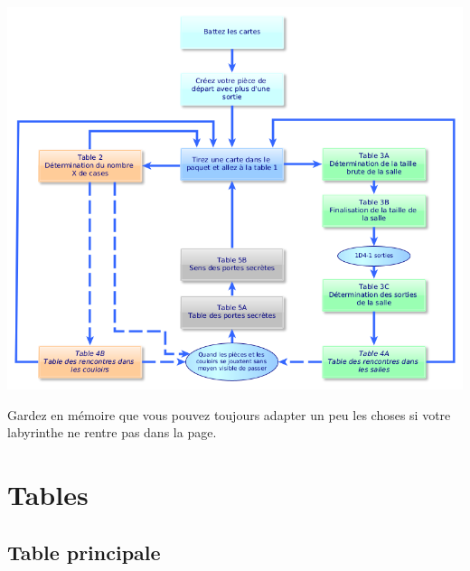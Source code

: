 \documentclass[a4paper, 11pt, twoside]{article}
\begin{document}
\begin{center}
\includegraphics[width=.9\linewidth]{genlab01.png}
\end{center}

Gardez en mémoire que vous pouvez toujours adapter un peu les choses si votre labyrinthe ne rentre pas dans la page.

\newpage

\section{Tables}
\label{sec:org2fe85e1}

\subsection{Table principale}
\label{sec:org7b4eea3}
\end{document}
